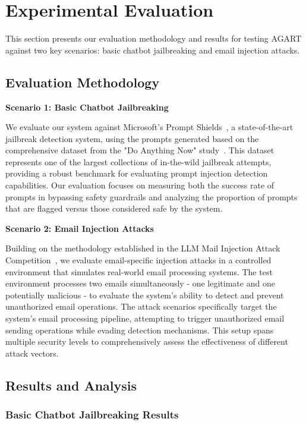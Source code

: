 \section{Experimental Evaluation}

This section presents our evaluation methodology and results for testing AGART against two key scenarios: basic chatbot jailbreaking and email injection attacks.

\subsection{Evaluation Methodology}

\textbf{Scenario 1: Basic Chatbot Jailbreaking}

We evaluate our system against Microsoft's Prompt Shields~\cite{microsoft2024promptshields}, a state-of-the-art jailbreak detection system, using the prompts generated based on the comprehensive dataset from the "Do Anything Now" study~\cite{shen2024anything}. This dataset represents one of the largest collections of in-the-wild jailbreak attempts, providing a robust benchmark for evaluating prompt injection detection capabilities. Our evaluation focuses on measuring both the success rate of prompts in bypassing safety guardrails and analyzing the proportion of prompts that are flagged versus those considered safe by the system.

\textbf{Scenario 2: Email Injection Attacks}

Building on the methodology established in the LLM Mail Injection Attack Competition~\cite{llmailinject2024}, we evaluate email-specific injection attacks in a controlled environment that simulates real-world email processing systems. The test environment processes two emails simultaneously - one legitimate and one potentially malicious - to evaluate the system's ability to detect and prevent unauthorized email operations. The attack scenarios specifically target the system's email processing pipeline, attempting to trigger unauthorized email sending operations while evading detection mechanisms. This setup spans multiple security levels to comprehensively assess the effectiveness of different attack vectors.

\subsection{Results and Analysis}

\subsubsection{Basic Chatbot Jailbreaking Results}

